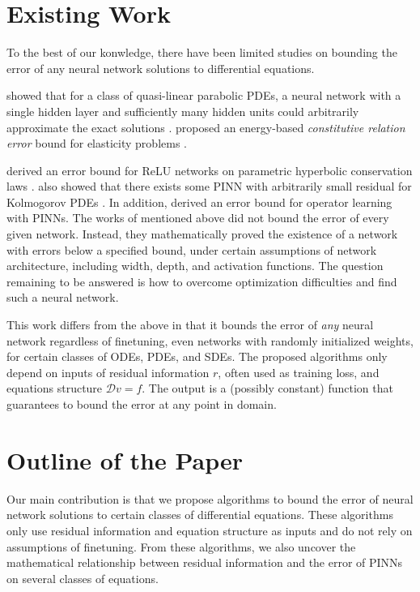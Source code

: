 \section{Existing Work} \label{section:existing-work}
    To the best of our konwledge, there have been limited studies on bounding the error of any neural network solutions to differential equations.

    \citeauthor{sirignano2018dgm} showed that for a class of quasi-linear parabolic PDEs, a neural network with a single hidden layer and sufficiently many hidden units could arbitrarily approximate the exact solutions \cite{sirignano2018dgm}.
    \citeauthor{guo2022energy} proposed an energy-based \textit{constitutive relation error} bound for elasticity problems \cite{guo2022energy}.

    \citeauthor{de2022errorhyperbolic} derived an error bound for ReLU networks on parametric hyperbolic conservation laws \cite{de2022errorhyperbolic}.
    \citeauthor{de2022errorkolmogorov} also showed that there exists some PINN with arbitrarily small residual for Kolmogorov PDEs \cite{de2022errorkolmogorov}.
    In addition, \citeauthor{de2022generic} derived an error bound for operator learning with PINNs\cite{de2022generic}.
    The works of \citeauthor{de2022errorhyperbolic} mentioned above did not bound the error of every given network.
    Instead, they mathematically proved the existence of a network with errors below a specified bound, under certain assumptions of network architecture, including width, depth, and activation functions. 
    The question remaining to be answered is how to overcome optimization difficulties and find such a neural network.

    This work differs from the above in that it bounds the error of \textit{any} neural network regardless of finetuning, even networks with randomly initialized weights, for certain classes of ODEs, PDEs, and SDEs.
    The proposed algorithms only depend on inputs of residual information $r$, often used as training loss, and equations structure $\mathcal{D} v = f$.
    The output is a (possibly constant) function that guarantees to bound the error at any point in domain.

\section{Outline of the Paper}\label{section:outline-of-the-paper}

Our main contribution is that we propose algorithms to bound the error of neural network solutions to certain classes of differential equations. 
These algorithms only use residual information and equation structure as inputs and do not rely on assumptions of finetuning. 
From these algorithms, we also uncover the mathematical relationship between residual information and the error of PINNs on several classes of equations.


